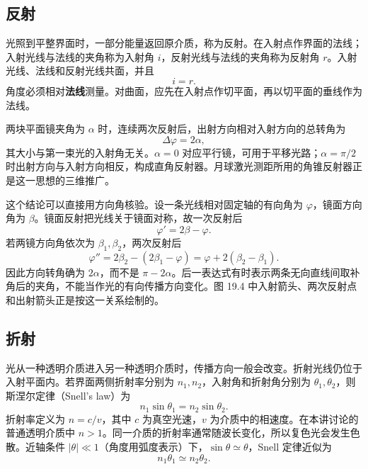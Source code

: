 \AtmosphereWavefrontPanel

\subsection*{反射}

光照到平整界面时，一部分能量返回原介质，称为反射。在入射点作界面的法线；入射光线与法线的夹角称为入射角 $i$，反射光线与法线的夹角称为反射角 $r$。入射光线、法线和反射光线共面，并且
\begin{equation}
  i=r.
\end{equation}
角度必须相对\textbf{法线}测量。对曲面，应先在入射点作切平面，再以切平面的垂线作为法线。

两块平面镜夹角为 $\alpha$ 时，连续两次反射后，出射方向相对入射方向的总转角为
\begin{equation}
  \Delta\varphi=2\alpha,
\end{equation}
其大小与第一束光的入射角无关。$\alpha=0$ 对应平行镜，可用于平移光路；$\alpha=\pi/2$ 时出射方向与入射方向相反，构成直角反射器。月球激光测距所用的角锥反射器正是这一思想的三维推广。

这个结论可以直接用方向角核验。设一条光线相对固定轴的有向角为 $\varphi$，镜面方向角为 $\beta$。镜面反射把光线关于镜面对称，故一次反射后
\[
 \varphi'=2\beta-\varphi.
\]
若两镜方向角依次为 $\beta_1,\beta_2$，两次反射后
\[
 \varphi''=2\beta_2-(2\beta_1-\varphi)
 =\varphi+2(\beta_2-\beta_1).
\]
因此方向转角确为 $2\alpha$，而不是 $\pi-2\alpha$。后一表达式有时表示两条无向直线间取补角后的夹角，不能当作光的有向传播方向变化。图 19.4 中入射箭头、两次反射点和出射箭头正是按这一关系绘制的。


\ReflectionPanel

\subsection*{折射}

光从一种透明介质进入另一种透明介质时，传播方向一般会改变。折射光线仍位于入射平面内。若界面两侧折射率分别为 $n_1,n_2$，入射角和折射角分别为 $\theta_1,\theta_2$，则斯涅尔定律（Snell's law）为
\begin{equation}
  n_1\sin\theta_1=n_2\sin\theta_2.
\end{equation}
折射率定义为 $n=c/v$，其中 $c$ 为真空光速，$v$ 为介质中的相速度。在本讲讨论的普通透明介质中 $n>1$。同一介质的折射率通常随波长变化，所以复色光会发生色散。近轴条件 $|\theta|\ll 1$（角度用弧度表示）下，$\sin\theta\simeq\theta$，Snell 定律近似为
\begin{equation}
  n_1\theta_1\simeq n_2\theta_2.
\end{equation}

